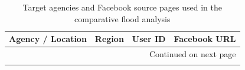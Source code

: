 \documentclass[12pt,a4paper]{report}
\begin{document}
{\small
	\setlength{\tabcolsep}{3pt}
	\begin{longtable}{@{}
			l                                     %
			l                                     %
			l                                     %
			>{\raggedright\arraybackslash}p{5.75cm} %
			@{}}
		
		\caption{Target agencies and Facebook source pages used in the comparative flood analysis}
		\label{tab:target-agencies}\\
		
		\toprule
		\textbf{Agency / Location} & \textbf{Region} & \textbf{User ID} & \textbf{Facebook URL} \\
		\midrule
		\endhead
		
		\midrule
		\multicolumn{4}{r}{Continued on next page} \\
		\endfoot
		
		\bottomrule
		\endlastfoot
		

\end{longtable}}
\end{document}
